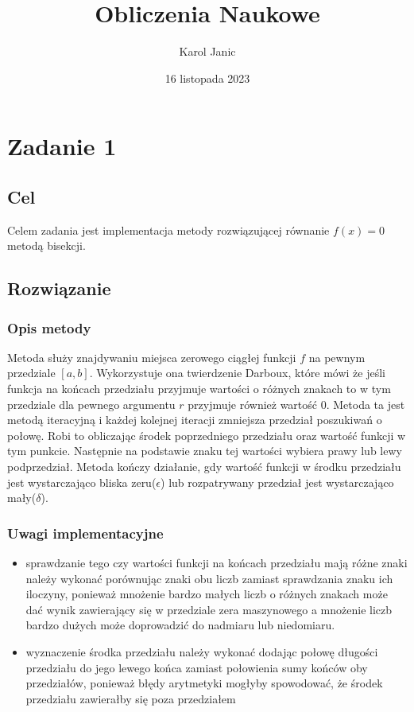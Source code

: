 \documentclass{article}
\title{Obliczenia Naukowe}
\author{Karol Janic}
\date{16 listopada 2023}
\begin{document}
\begin{titlingpage}
    \maketitle
\end{titlingpage}

\tableofcontents

\newpage

\section{Zadanie 1}
\subsection{Cel}
Celem zadania jest implementacja metody rozwiązującej równanie $f(x) = 0$ metodą bisekcji.

\subsection{Rozwiązanie}
\subsubsection{Opis metody}
Metoda służy znajdywaniu miejsca zerowego ciągłej funkcji $f$ na pewnym przedziale $[a, b]$. Wykorzystuje ona twierdzenie Darboux, 
które mówi że jeśli funkcja na końcach przedziału przyjmuje wartości o różnych znakach to w tym przedziale dla pewnego argumentu $r$ 
przyjmuje również wartość $0$. Metoda ta jest metodą iteracyjną i każdej kolejnej iteracji zmniejsza przedział poszukiwań o połowę. 
Robi to obliczając środek poprzedniego przedziału oraz wartość funkcji w tym punkcie. Następnie na podstawie znaku tej wartości 
wybiera prawy lub lewy podprzedział. Metoda kończy działanie, gdy wartość funkcji w środku przedziału jest wystarczająco bliska zeru($\epsilon$)
lub rozpatrywany przedział jest wystarczająco mały($\delta$).

\subsubsection{Uwagi implementacyjne}
\begin{itemize}
    \item sprawdzanie tego czy wartości funkcji na końcach przedziału mają różne znaki należy wykonać porównując znaki obu liczb 
    zamiast sprawdzania znaku ich iloczyny, ponieważ mnożenie bardzo małych liczb o różnych znakach może dać wynik zawierający się
    w przedziale zera maszynowego a mnożenie liczb bardzo dużych może doprowadzić do nadmiaru lub niedomiaru.
    \item wyznaczenie środka przedziału należy wykonać dodając połowę długości przedziału do jego lewego końca zamiast połowienia sumy końców oby przedziałów, 
    ponieważ błędy arytmetyki mogłyby spowodować, że środek przedziału zawierałby się poza przedziałem
\end{itemize}
\end{document}
